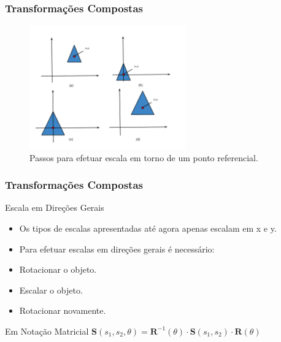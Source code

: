 \documentclass{beamer}
\begin{document}
\begin{frame}
\frametitle{Transformações Compostas}
		
	\begin{figure}[!h]
		\begin{center}
			\includegraphics[width=0.6\textwidth]{Figures/EscalaPontoFixo}
			\caption{Passos para efetuar escala em torno de um ponto referencial.}
		\end{center}
	\end{figure}
		
\end{frame}	

\begin{frame}
\frametitle{Transformações Compostas}
	\begin{block}{Escala em Direções Gerais}
		
		\begin{itemize}
			\item Os tipos de escalas apresentadas até agora apenas escalam em x e y.
			\item Para efetuar escalas em direções gerais é necessário:
			\item Rotacionar o objeto.
			\item Escalar o objeto.
			\item Rotacionar novamente.
		\end{itemize}
	\end{block}
	
	\begin{block}{Em Notação Matricial}
		$\textbf{S}(s_1,s_2,\theta) = \textbf{R}^{-1}(\theta) \cdot \textbf{S}(s_1,s_2) \cdot \textbf{R}(\theta)$ 
	\end{block}
		
\end{frame}	
\end{document}
